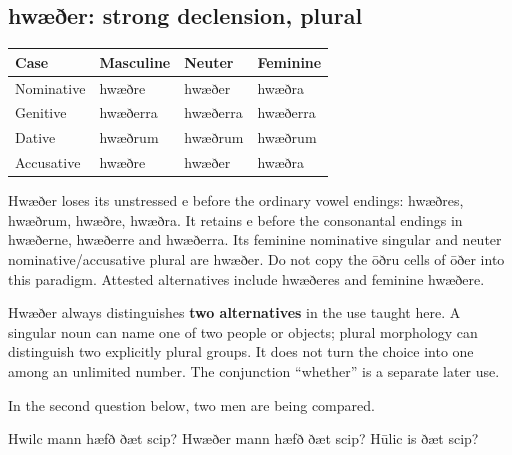 \subsection*{hwæðer: strong declension, plural}

\par\begingroup
\fontsize{10.5}{13.2}\selectfont
\setlength{\LTleft}{0pt}\setlength{\LTright}{\fill}
\noindent
\begin{tabular}{@{}>{\raggedright\arraybackslash}p{28.89mm}>{\raggedright\arraybackslash}p{28.89mm}>{\raggedright\arraybackslash}p{28.89mm}>{\raggedright\arraybackslash}p{28.89mm}@{}}
\toprule
\textbf{Case} & \textbf{Masculine} & \textbf{Neuter} & \textbf{Feminine} \\
\midrule
Nominative & hwæðre & hwæðer & hwæðra \\
Genitive & hwæðerra & hwæðerra & hwæðerra \\
Dative & hwæðrum & hwæðrum & hwæðrum \\
Accusative & hwæðre & hwæðer & hwæðra \\
\bottomrule
\end{tabular}
\par\endgroup

Hwæðer loses its unstressed e before the ordinary vowel endings: hwæðres, hwæðrum, hwæðre, hwæðra. It retains e before the consonantal endings in hwæðerne, hwæðerre and hwæðerra. Its feminine nominative singular and neuter nominative/\allowbreak{}accusative plural are hwæðer. Do not copy the ōðru cells of ōðer into this paradigm. Attested alternatives include hwæðeres and feminine hwæðere.

Hwæðer always distinguishes \textbf{two alternatives} in the use taught here. A singular noun can name one of two people or objects; plural morphology can distinguish two explicitly plural groups. It does not turn the choice into one among an unlimited number. The conjunction “whether” is a separate later use.

In the second question below, two men are being compared.

Hwilc mann hæfð ðæt scip? Hwæðer mann hæfð ðæt scip? Hūlic is ðæt scip?

